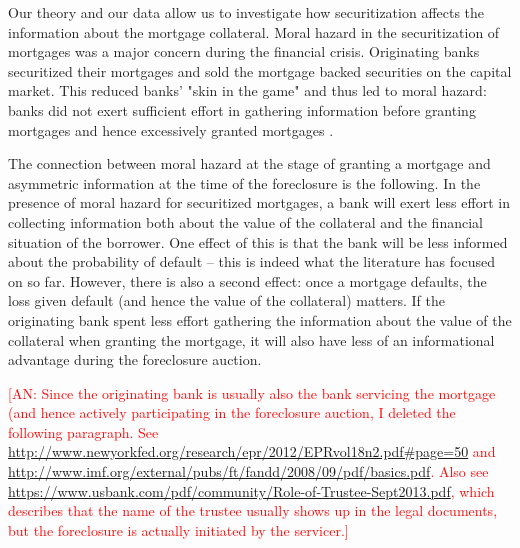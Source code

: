 \documentclass[11pt,twopage]{article}
\newcommand{\AN}[1]{\textcolor{red}{[AN: #1]}}
\begin{document}
%

Our theory and our data allow us to investigate how securitization affects the information about
the mortgage collateral. Moral hazard in the securitization of mortgages was a major
concern during the financial crisis.  Originating banks securitized
their mortgages and sold the mortgage backed securities on the capital market.
 This reduced banks' "skin in the
game" and thus led to moral hazard:
banks did not exert sufficient effort in gathering information before
granting mortgages and hence excessively granted mortgages \cite[see][]{mian2009consequences,dewatripont2010balancing,keys2008did}.

The connection between moral hazard at the stage of granting a
mortgage and asymmetric information at the time of the foreclosure is
the following. In the presence of moral hazard for securitized
mortgages, a bank will exert less effort in collecting information
both about the value of the collateral and the financial situation of
the borrower. One effect of this is that the bank will be less
informed about the probability of default -- this is indeed what the
literature has focused on so far. However, there is also a second
effect: once a mortgage defaults, the loss given default (and hence
the value of the collateral) matters. If the originating bank spent
less effort gathering the information about the value of the collateral
when granting the mortgage, it will also have less of an informational
advantage during the foreclosure auction.

\AN{Since the originating bank is usually also the bank servicing the mortgage 
(and hence actively participating in the foreclosure auction, I deleted the following paragraph. See 
\url{http://www.newyorkfed.org/research/epr/2012/EPRvol18n2.pdf#page=50} 
 and
\url{http://www.imf.org/external/pubs/ft/fandd/2008/09/pdf/basics.pdf}. Also see 
\url{https://www.usbank.com/pdf/community/Role-of-Trustee-Sept2013.pdf}, which describes that
the name of the trustee usually shows up in the legal documents, but the foreclosure is actually
initiated by the servicer.}

\end{document}
